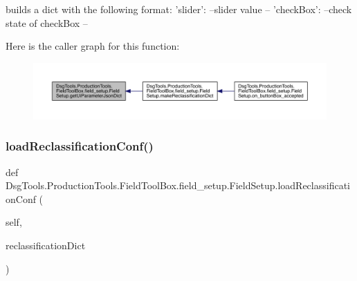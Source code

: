 \begin{DoxyVerb}builds a dict with the following format:
{
    'slider': --slider value --
    'checkBox': --check state of checkBox --
}
\end{DoxyVerb}
 Here is the caller graph for this function\+:
\nopagebreak
\begin{figure}[H]
\begin{center}
\leavevmode
\includegraphics[width=350pt]{class_dsg_tools_1_1_production_tools_1_1_field_tool_box_1_1field__setup_1_1_field_setup_a1f0277a1c21a49371a30311991ea2cdd_icgraph}
\end{center}
\end{figure}
\mbox{\label{class_dsg_tools_1_1_production_tools_1_1_field_tool_box_1_1field__setup_1_1_field_setup_aca5f44dea463a3d6404805334368dbb9}} 
\subsubsection{\texorpdfstring{load\+Reclassification\+Conf()}{loadReclassificationConf()}}
{\footnotesize\ttfamily def Dsg\+Tools.\+Production\+Tools.\+Field\+Tool\+Box.\+field\+\_\+setup.\+Field\+Setup.\+load\+Reclassification\+Conf (\begin{DoxyParamCaption}\item[{}]{self,  }\item[{}]{reclassification\+Dict }\end{DoxyParamCaption})}

